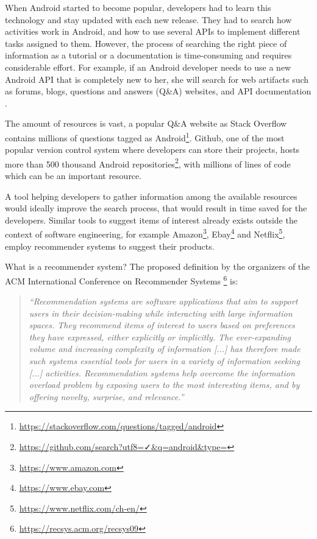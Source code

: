 \documentclass[12pt,mscthesis]{usiinfthesis}
\begin{document}
	When Android started to become popular, developers had to learn this technology and stay updated with each new release.
	They had to search how activities work in Android, and how to use several APIs to implement different tasks assigned to them.
	However, the process of searching the right piece of information as a tutorial or a documentation is time-consuming and requires considerable effort.
	For example, if an Android developer needs to use a new Android API that is completely new to her, she will search for web artifacts such as forums, blogs, questions and answers (Q\&A) websites, and API documentation \cite{Sim:2011:WSE:2063239.2063243}.


	The amount of resources is vast, a popular Q\&A website as Stack Overflow contains millions of questions tagged as Android\footnote{\url{https://stackoverflow.com/questions/tagged/android}}. Github, one of the most popular version control system where developers can store their projects, hosts more than 500 thousand Android repositories\footnote{\url{https://github.com/search?utf8=✓&q=android&type=}}, with millions of lines of code which can be an important resource.


	A tool helping developers to gather information among the available resources would ideally improve the search process, that would result in time saved for the developers.
	Similar tools to suggest items of interest already exists outside the context of software engineering, for example Amazon\footnote{\url{https://www.amazon.com}}, Ebay\footnote{\url{https://www.ebay.com}} and Netflix\footnote{\url{https://www.netflix.com/ch-en/}}, employ recommender systems to suggest their products.


	What is a recommender system? The proposed definition by the organizers of the ACM International Conference on Recommender Systems \footnote{\url{https://recsys.acm.org/recsys09}} is: \\

	  \blockquote{\textit{``Recommendation systems are software applications that aim to support users in their decision-making while interacting with large information spaces. They recommend items of interest to users based on preferences they have expressed, either explicitly or implicitly. The ever-expanding volume and increasing complexity of information [...] has therefore made such systems essential tools for users in a variety of information seeking [...] activities. Recommendation systems help overcome the information overload problem by exposing users to the most interesting items, and by offering novelty, surprise, and relevance.''}}
\end{document}
